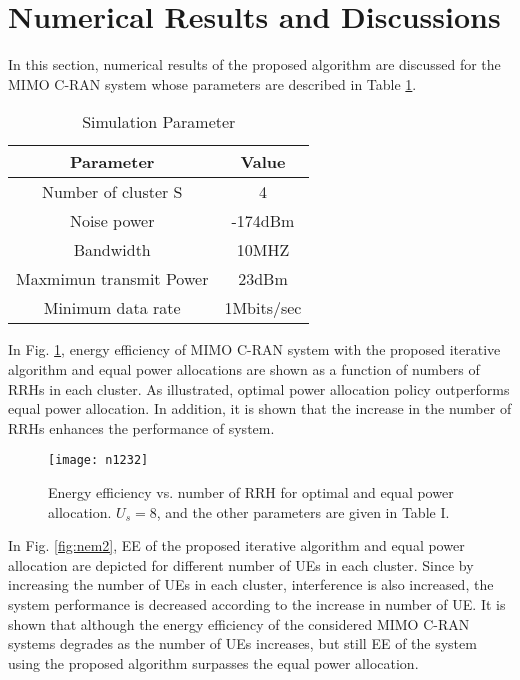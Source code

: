 \documentclass[conference,10pt,twocolumn,letter]{IEEEtran}
\begin{document}
\section{Numerical Results and Discussions}
In this section, numerical results of the proposed algorithm are discussed for the MIMO C-RAN system whose parameters are described in Table \ref{tab:title}.

 \begin{table}[H]
 \caption {Simulation Parameter} \label{tab:title} 
 \begin{center}
  \begin{tabular}{||c c ||} 
  \hline
  Parameter & Value \\ [0.5ex] 
  \hline\hline
  Number of cluster S & 4 \\ 
  \hline
  Noise power & -174dBm\\
  \hline
  Bandwidth & 10MHZ \\
  \hline
 Maxmimun transmit Power & 23dBm \\
  \hline
  Minimum data rate &  1Mbits/sec \\ [1ex] 
  \hline
 \end{tabular}
 \end{center}
 \end{table}
 
 
In Fig. \ref{fig:nem1},
energy efficiency of MIMO C-RAN system with the proposed iterative algorithm and equal power allocations are shown as a function of numbers of RRHs in each cluster.
As illustrated, optimal power allocation policy outperforms equal power allocation. In addition, it is shown that the increase in the number of RRHs enhances the performance of system.
 
  \begin{figure}
  \centering
    \texttt{[image: n1232]}
  \caption{Energy efficiency vs. number of RRH for optimal and equal power allocation. $U_s=8$, and the other parameters are given in Table I.}
  \label{fig:nem1}
\end{figure}


In Fig. \ref{fig:nem2}, EE of the proposed iterative algorithm and equal power allocation are depicted for different number of UEs in each cluster. Since by increasing the number of UEs in each cluster, interference is also increased, the system performance is decreased according to the increase in number of UE. It is shown that although the energy efficiency of the considered MIMO C-RAN systems degrades as the number of UEs increases, but still EE of the system using the proposed algorithm surpasses the equal power allocation.
  
\end{document}
